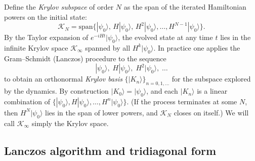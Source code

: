 \documentclass[11pt]{article}
\begin{document}
Define the \emph{Krylov subspace} of order $N$ as the span of the iterated Hamiltonian powers on the initial state:
\begin{equation*}
\mathcal{K}_N 
= \mathrm{span}\{|\psi_0\rangle,\,H|\psi_0\rangle,\,H^2|\psi_0\rangle,\dots, H^{N-1}|\psi_0\rangle\}.
\end{equation*}
By the Taylor expansion of $e^{-iHt}|\psi_0\rangle$, the evolved state at any time $t$ lies in the infinite Krylov space $\mathcal{K}_\infty$ spanned by all $H^k|\psi_0\rangle$.  In practice one applies the Gram–Schmidt (Lanczos) procedure to the sequence 
\begin{equation*}
|\psi_0\rangle,\;H|\psi_0\rangle,\;H^2|\psi_0\rangle,\;\dots
\end{equation*}
to obtain an orthonormal \emph{Krylov basis} $\{|K_n\rangle\}_{n=0,1,\dots}$ for the subspace explored by the dynamics.  By construction $|K_0\rangle=|\psi_0\rangle$, and each $|K_n\rangle$ is a linear combination of $\{|\psi_0\rangle,H|\psi_0\rangle,\dots,H^n|\psi_0\rangle\}$.  (If the process terminates at some $N$, then $H^N|\psi_0\rangle$ lies in the span of lower powers, and $\mathcal{K}_N$ closes on itself.)  We will call $\mathcal{K}_\infty$ simply the Krylov space.

\subsection{Lanczos algorithm and tridiagonal form}
\end{document}
